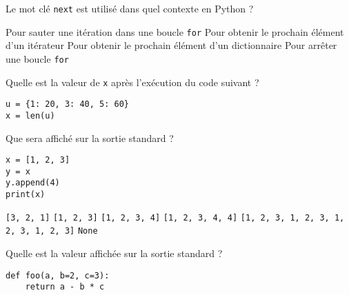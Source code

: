 \documentclass[french,a4paper,addpoints,11pt]{exam}
\begin{document}
\begin{questions}
    \question

    Le mot clé \lstinline|next| est utilisé dans quel contexte en Python ?

    \begin{checkboxes}
        \choice Pour sauter une itération dans une boucle \lstinline|for|
        \CorrectChoice Pour obtenir le prochain élément d'un itérateur
        \choice Pour obtenir le prochain élément d'un dictionnaire
        \choice Pour arrêter une boucle \lstinline|for|
    \end{checkboxes}

    \question

    Quelle est la valeur de \lstinline|x| après l'exécution du code suivant ?

    \begin{lstlisting}
u = {1: 20, 3: 40, 5: 60}
x = len(u)
\end{lstlisting}

    \begin{multicols}{4}
        \begin{checkboxes}
        \end{checkboxes}
    \end{multicols}

    \question

    Que sera affiché sur la sortie standard ?

    \begin{lstlisting}
x = [1, 2, 3]
y = x
y.append(4)
print(x)
\end{lstlisting}

    \begin{multicols}{2}
        \begin{checkboxes}
            \choice \lstinline|[3, 2, 1]|
            \choice \lstinline|[1, 2, 3]|
            \CorrectChoice \lstinline|[1, 2, 3, 4]|
            \choice \lstinline|[1, 2, 3, 4, 4]|
            \choice \lstinline|[1, 2, 3, 1, 2, 3, 1, 2, 3, 1, 2, 3]|
            \choice \lstinline|None|
        \end{checkboxes}
    \end{multicols}

    \question

    Quelle est la valeur affichée sur la sortie standard ?

    \begin{lstlisting}
def foo(a, b=2, c=3):
    return a - b * c


\end{lstlisting}
\end{questions}
\end{document}
